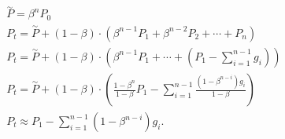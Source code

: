 \documentclass[lettersize,journal]{IEEEtran}
\begin{document}
\vspace{-3mm}
\begin{eqnarray}
&&\!\!\!\!\!\!\!\!\!\!\!\!\!\!\!\!\overset{\sim}{P}=\beta^{n} P_{0}\label{eq11-0}\\
&&\!\!\!\!\!\!\!\!\!\!\!\!\!\!\!\! P_{t}=\overset{\sim}{P}+(1-\beta) \cdot\left(\beta^{n-1} P_{1}+\beta^{n-2} P_{2}+\cdots+ P_{n}\right)  \qquad \quad  
    \label{eq11-1}\\
&&\!\!\!\!\!\!\!\!\!\!\!\!\!\!\!\! P_{t}=\overset{\sim}{P}+(1-\beta) \cdot\left(\beta^{n-1} P_{1}+\cdots+\left(P_{1}-\sum_{i=1}^{n-1} g_{i}\right)\right) 
    \label{eq11-2}\\
&&\!\!\!\!\!\!\!\!\!\!\!\!\!\!\!\! P_{t}=\overset{\sim}{P}+(1-\beta) \cdot\left(\frac{1-\beta^{n}}{1-\beta} P_{1}-\sum_{i=1}^{n-1} \frac{\left(1-\beta^{n-i}\right) g_{i}}{1-\beta}\right) 
    \label{eq11-3}\\
&&\!\!\!\!\!\!\!\!\!\!\!\!\!\!\!\! P_{t} \approx P_{1}-\sum_{i=1}^{n-1}\left(1-\beta^{n-i}\right) g_{i}. \label{eq11-4}
\end{eqnarray}
    
\end{document}
